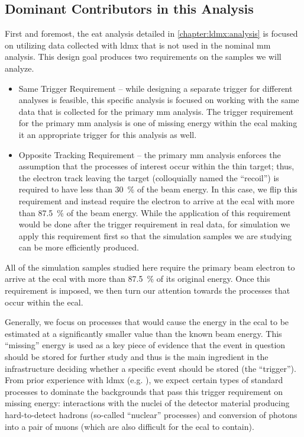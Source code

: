 \subsection{Dominant Contributors in this Analysis}
First and foremost, the \ac{eat} analysis detailed in \cref{chapter:ldmx:analysis} is focused
on utilizing data collected with \ac{ldmx} that is not used in the nominal \ac{mm} analysis.
This design goal produces two requirements on the samples we will analyze.
\begin{itemize}
  \item Same Trigger Requirement -- while designing a separate trigger for different analyses
        is feasible, this specific analysis is focused on working with the same data that
        is collected for the primary \ac{mm} analysis.
        The trigger requirement for the primary \ac{mm} analysis is one of missing energy
        within the \ac{ecal} making it an appropriate trigger for this analysis as well.
  \item Opposite Tracking Requirement -- the primary \ac{mm} analysis enforces the assumption that
        the processes of interest occur within the thin target; thus, the electron track leaving
        the target (colloquially named the ``recoil'') is required to have less than
        \qty{30}{\percent} of the beam energy. In this case, we flip this requirement and instead
        require the electron to arrive at the \ac{ecal} with more than \qty{87.5}{\percent} of the
        beam energy. While the application of this requirement would be done after the trigger
        requirement in real data, for simulation we apply this requirement first so that the
        simulation samples we are studying can be more efficiently produced.
\end{itemize}
All of the simulation samples studied here require the primary beam electron to arrive
at the \ac{ecal} with more than \qty{87.5}{\percent} of its original energy.
Once this requirement is imposed, we then turn our attention towards the processes
that occur within the \ac{ecal}.

Generally, we focus on processes that would cause the energy in the \ac{ecal} to be
estimated at a significantly smaller value than the known beam energy.
This ``missing'' energy is used as a key piece of evidence that the event in question
should be stored for further study and thus is the main ingredient in the infrastructure
deciding whether a specific event should be stored (the ``trigger'').
From prior experience with \ac{ldmx} (e.g. \cite{ldmx-whitepaper,ldmx-photon-reject-2020}),
we expect certain types of standard processes to dominate the backgrounds that pass this
trigger requirement on missing energy: interactions with the nuclei of the detector
material producing hard-to-detect hadrons (so-called ``nuclear'' processes) and conversion
of photons into a pair of muons (which are also difficult for the \ac{ecal} to contain).

